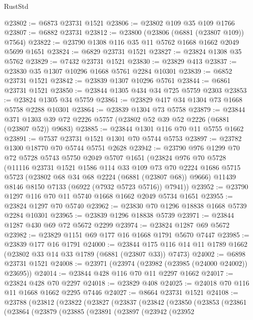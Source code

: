 \begin{lexlean}{RustStd}
\begin{coremodule}
@23802 := @6873 @23731 @1521
@23806 := @23802 @109 @35 @109 @1766
@23807 := @6882 @23731
@23812 := @23800 (@23806 (@6881 (@23807 @109)) @7564)
@23822 := @23790 @1308 @116 @35 @11 @5762 @1668 @1662 @2049 @5699 @1651
@23824 := @6829 @23731 @1521
@23827 := @23824 @1308 @35 @5762
@23829 := @7432 @23731 @1521
@23830 := @23829 @413
@23837 := @23830 @35 @1307 @10296 @1668 @5761 @2284 @10301
@23839 := @6852 @23731 @1521
@23842 := @23839 @1307 @10296 @5761
@23844 := @6861 @23731 @1521
@23850 := @23844 @1305 @434 @34 @725 @5759 @2303
@23853 := @23824 @1305 @34 @5759
@23861 := @23829 @417 @34 @1304 @73 @1668 @5758 @2288 @10301
@23864 := @23839 @1304 @73 @5758
@23879 := @23844
    @371
    @1303
    @39
    @72
    @2226
    @5757
    (@23802 @52 @39 @52 @2226 (@6881 (@23807 @52)) @9683)
@23885 := @23844 @1301 @116 @70 @11 @5755 @1662
@23891 := @7537 @23731 @1521 @1301 @70 @5744 @5753
@23897 := @23782 @1300 @18770 @70 @5744 @5751 @2628
@23942 := @23790
    @976
    @1299
    @70
    @72
    @5728
    @5743
    @5750
    @2049
    @5707
    @1651
    (@23824
      @976
      @70
      @5728
      (@11116
        @23731
        @1521
        @1586
        @114
        @33
        @109
        @73
        @70
        @2224
        @1686
        @5715
        @5723
        (@23802 @68 @34 @68 @2224 (@6881 (@23807 @68)) @9666)
        @11439
        @8146
        @8150
        @7133
        (@6922 (@7932 @5723 @5716))
        @7941))
@23952 := @23790 @1297 @116 @70 @11 @5740 @1668 @1662 @2049 @5734 @1651
@23955 := @23824 @1297 @70 @5740
@23962 := @23830 @70 @1296 @18838 @1668 @5739 @2284 @10301
@23965 := @23839 @1296 @18838 @5739
@23971 := @23844 @1287 @430 @69 @72 @5672 @2299
@23974 := @23824 @1287 @69 @5672
@23982 := @23829 @1151 @69 @177 @16 @1668 @1791 @5670 @7447
@23985 := @23839 @177 @16 @1791
@24000 := @23844 @175 @116 @14 @11 @1789 @1662 (@23802 @33 @14 @33 @1789 (@6881 (@23807 @33)) @7473)
@24002 := @6898 @23731 @1521
@24008 := @23971 (@23974 (@23982 (@23985 (@24000 @24002)) @23695))
@24014 := @23844 @428 @116 @70 @11 @2297 @1662
@24017 := @23824 @428 @70 @2297
@24018 := @23829 @408
@24025 := @24018 @70 @116 @11 @1668 @1662 @2295 @7446
@24027 := @8664 @23731 @1521
@24108 := @23788
    (@23812
      (@23822
        (@23827
          (@23837
            (@23842
              (@23850
                (@23853
                  (@23861
                    (@23864
                      (@23879
                        (@23885
                          (@23891
                            (@23897
                              (@23942
                                (@23952

\end{coremodule}
\end{lexlean}
